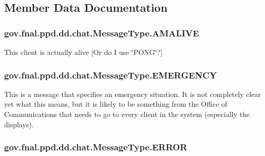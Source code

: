 \subsection{Member Data Documentation}
\hypertarget{enumgov_1_1fnal_1_1ppd_1_1dd_1_1chat_1_1MessageType_aed446af88466c871fc01970edcaf84dd}{
\subsubsection[{A\-M\-A\-L\-I\-V\-E}]{\setlength{\rightskip}{0pt plus 5cm}gov.\-fnal.\-ppd.\-dd.\-chat.\-Message\-Type.\-A\-M\-A\-L\-I\-V\-E}}\label{enumgov_1_1fnal_1_1ppd_1_1dd_1_1chat_1_1MessageType_aed446af88466c871fc01970edcaf84dd}
This client is actually alive \mbox{[}Or do I use \char`\"{}\-P\-O\-N\-G\char`\"{}?\mbox{]} \hypertarget{enumgov_1_1fnal_1_1ppd_1_1dd_1_1chat_1_1MessageType_a8d59ce28c421afbc1ef0172b13f8b2eb}{
\subsubsection[{E\-M\-E\-R\-G\-E\-N\-C\-Y}]{\setlength{\rightskip}{0pt plus 5cm}gov.\-fnal.\-ppd.\-dd.\-chat.\-Message\-Type.\-E\-M\-E\-R\-G\-E\-N\-C\-Y}}\label{enumgov_1_1fnal_1_1ppd_1_1dd_1_1chat_1_1MessageType_a8d59ce28c421afbc1ef0172b13f8b2eb}
This is a message that specifies an emergency situation. It is not completely clear yet what this means, but it is likely to be something from the Office of Communications that needs to go to every client in the system (especially the displays). \hypertarget{enumgov_1_1fnal_1_1ppd_1_1dd_1_1chat_1_1MessageType_ad16db5c68a6e9d71810ee9662e9dcf73}{
\subsubsection[{E\-R\-R\-O\-R}]{\setlength{\rightskip}{0pt plus 5cm}gov.\-fnal.\-ppd.\-dd.\-chat.\-Message\-Type.\-E\-R\-R\-O\-R}}\label{enumgov_1_1fnal_1_1ppd_1_1dd_1_1chat_1_1MessageType_ad16db5c68a6e9d71810ee9662e9dcf73}
